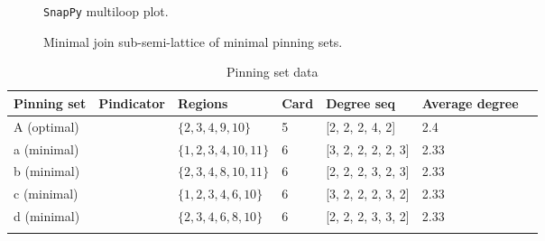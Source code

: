 \documentclass{article}%
\begin{document}
\begin{multicols}{2}
\begin{figure}[H]
\centering

\caption{\texttt{SnapPy} multiloop plot.}
\label{fig:tex/img/[[1, 4, 18, 3], [1, 12, 2, 13], [4, 10, 5, 9], [18, 9, 17, 8], [3, 11, 2, 12], [13, 11, 14, 10], [5, 14, 6, 15], [17, 7, 16, 8], [6, 16, 7, 15]].svg}
\end{figure}
\columnbreak

\begin{figure}[H]
\centering
\scalebox{0.8}{}
\caption{Minimal join sub-semi-lattice of minimal pinning sets.}
\label{fig:tex/img/[[1, 4, 18, 3], [1, 12, 2, 13], [4, 10, 5, 9], [18, 9, 17, 8], [3, 11, 2, 12], [13, 11, 14, 10], [5, 14, 6, 15], [17, 7, 16, 8], [6, 16, 7, 15]].pgf}
\end{figure}
\end{multicols}

\newpage

\begin{table}[ht]
	\caption{Pinning set data}
	\centering
	\renewcommand{\arraystretch}{1.5}
	\begin{tabularx}{\textwidth}{lXXXXXX}
		\toprule
			Pinning set & Pindicator & Regions & Card & Degree seq & Average degree\\
			\hline
			A (optimal) & {\Huge\textcolor{red0}{\textbullet}} & $\{2,3,4,9,10\}$ & 5 & [2, 2, 2, 4, 2] & 2.4 \\
			a (minimal) & {\Huge\textcolor{green0}{\textbullet}} & $\{1,2,3,4,10,11\}$ & 6 & [3, 2, 2, 2, 2, 3] & 2.33 \\
			b (minimal) & {\Huge\textcolor{green18}{\textbullet}} & $\{2,3,4,8,10,11\}$ & 6 & [2, 2, 2, 3, 2, 3] & 2.33 \\
			c (minimal) & {\Huge\textcolor{green37}{\textbullet}} & $\{1,2,3,4,6,10\}$ & 6 & [3, 2, 2, 2, 3, 2] & 2.33 \\
			d (minimal) & {\Huge\textcolor{green56}{\textbullet}} & $\{2,3,4,6,8,10\}$ & 6 & [2, 2, 2, 3, 3, 2] & 2.33 \\
		\bottomrule \\ 
	\end{tabularx}
\end{table}
\end{document}
